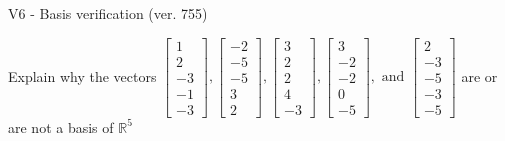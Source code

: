 \begin{exercise}
  \begin{exerciseTitle}V6 - Basis verification (ver. 755)\end{exerciseTitle}
  \begin{exerciseStatement}
    Explain why the vectors \(\left[\begin{array}{r}
1 \\
2 \\
-3 \\
-1 \\
-3
\end{array}\right] , \left[\begin{array}{r}
-2 \\
-5 \\
-5 \\
3 \\
2
\end{array}\right] , \left[\begin{array}{r}
3 \\
2 \\
2 \\
4 \\
-3
\end{array}\right] , \left[\begin{array}{r}
3 \\
-2 \\
-2 \\
0 \\
-5
\end{array}\right] , \text{ and } \left[\begin{array}{r}
2 \\
-3 \\
-5 \\
-3 \\
-5
\end{array}\right]\) are or are not a basis of \(\mathbb{R}^5\)	



\end{exerciseStatement}
\end{exercise}
